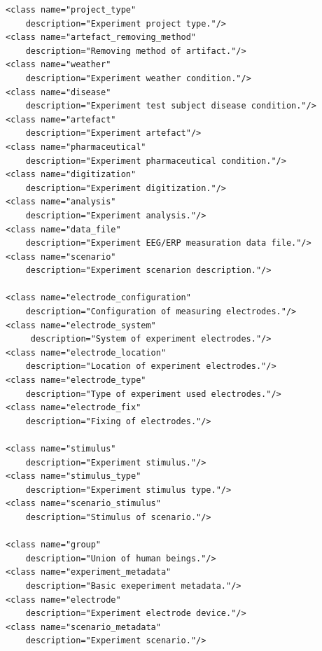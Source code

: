 \documentclass{projekt}
\begin{document}
\begin{verbatim}
<class name="project_type" 
    description="Experiment project type."/>
<class name="artefact_removing_method" 
    description="Removing method of artifact."/>
<class name="weather" 
    description="Experiment weather condition."/>
<class name="disease" 
    description="Experiment test subject disease condition."/>
<class name="artefact" 
    description="Experiment artefact"/>
<class name="pharmaceutical" 
    description="Experiment pharmaceutical condition."/>
<class name="digitization" 
    description="Experiment digitization."/>
<class name="analysis" 
    description="Experiment analysis."/>
<class name="data_file" 
    description="Experiment EEG/ERP measuration data file."/>
<class name="scenario" 
    description="Experiment scenarion description."/>

<class name="electrode_configuration" 
    description="Configuration of measuring electrodes."/>
<class name="electrode_system"
     description="System of experiment electrodes."/>
<class name="electrode_location" 
    description="Location of experiment electrodes."/>
<class name="electrode_type" 
    description="Type of experiment used electrodes."/>
<class name="electrode_fix" 
    description="Fixing of electrodes."/>

<class name="stimulus" 
    description="Experiment stimulus."/>
<class name="stimulus_type" 
    description="Experiment stimulus type."/>
<class name="scenario_stimulus" 
    description="Stimulus of scenario."/>

<class name="group" 
    description="Union of human beings."/>
<class name="experiment_metadata" 
    description="Basic exeperiment metadata."/>
<class name="electrode" 
    description="Experiment electrode device."/>
<class name="scenario_metadata" 
    description="Experiment scenario."/>
\end{verbatim}

\thispagestyle{plain}
\end{document}
